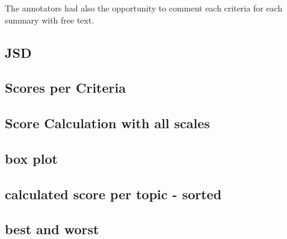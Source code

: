 The annotators had also the opportunity to comment each criteria for each summary with free text.

\subsection{JSD}
\subsection{Scores per Criteria}

\subsection{Score Calculation with all scales}
\subsection{box plot}
\subsection{calculated score per topic - sorted}

\subsection{best and worst}